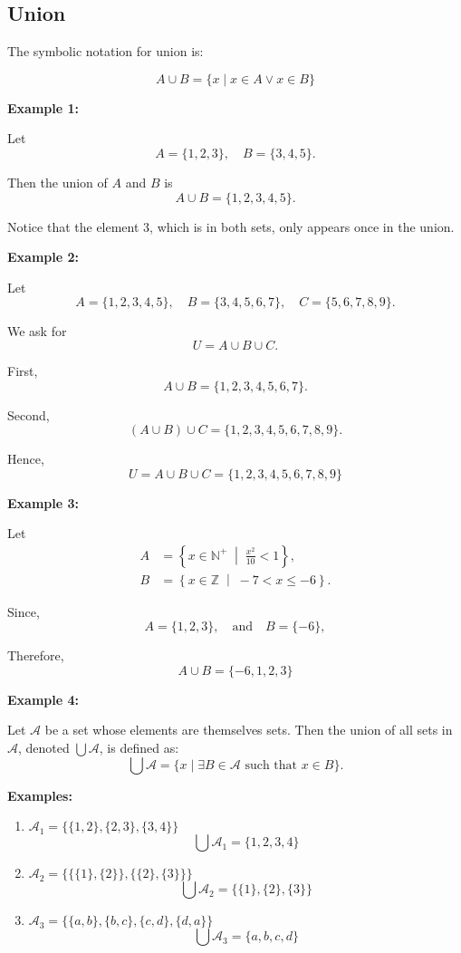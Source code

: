 \documentclass[12pt,a4paper,openany]{article}
\begin{document}
\subsection{Union}\label{Union}

The symbolic notation for union is:  

$$
A \cup B = \{x \mid x \in A \lor x \in B\}
$$

\textbf{Example 1:}

Let  
\[
A = \{1,2,3\}, \quad B = \{3,4,5\}.
\]

Then the union of $A$ and $B$ is  
\[
A \cup B = \{1,2,3,4,5\}.
\]

Notice that the element $3$, which is in both sets, only appears once in the union.

\textbf{Example 2:}

Let  
\[
A = \{1,2,3,4,5\}, \quad 
B = \{3,4,5,6,7\}, \quad
C = \{5,6,7,8,9\}.
\]

We ask for  
\[
U = A \cup B \cup C.
\]

First,  
\[
A \cup B = \{1,2,3,4,5,6,7\}.
\]

Second,  
\[
(A \cup B) \cup C = \{1,2,3,4,5,6,7,8,9\}.
\]

Hence,  
\[
\boxed{U = A \cup B \cup C = \{1,2,3,4,5,6,7,8,9\}}
\]

\textbf{Example 3:}

Let  
\[
\begin{aligned}
A &= \left\{ x \in \mathbb{N}^+ \;\middle|\; \frac{x^2}{10} < 1 \right\}, \\
B &= \left\{ x \in \mathbb{Z} \;\middle|\; -7 < x \leq -6 \right\}.
\end{aligned}
\]

Since,  
\[
A = \{1,2,3\}, \quad \text{and} \quad B = \{-6\},
\]

Therefore,  
\[
\boxed{A \cup B = \{-6,1,2,3\}}
\]

\textbf{Example 4:}

Let $\mathcal{A}$ be a set whose elements are themselves sets.  
Then the union of all sets in $\mathcal{A}$, denoted $\displaystyle\bigcup \mathcal{A}$, is defined as:
\[
\displaystyle\bigcup \mathcal{A} = \{ x \mid \exists B \in \mathcal{A} \text{ such that } x \in B \}.
\]

\textbf{Examples:}

\begin{enumerate}
    \item $\mathcal{A}_1 = \{ \{1,2\}, \{2,3\}, \{3,4\} \}$  
    \[
    \displaystyle\bigcup \mathcal{A}_1 = \{1,2,3,4\}
    \]
    
    \item $\mathcal{A}_2 = \{ \{ \{1\}, \{2\} \}, \{ \{2\}, \{3\} \} \}$  
    \[
    \displaystyle\bigcup \mathcal{A}_2 = \{ \{1\}, \{2\}, \{3\} \}
    \]
    
    \item $\mathcal{A}_3 = \{ \{a,b\}, \{b,c\}, \{c,d\}, \{d,a\} \}$  
    \[
    \displaystyle\bigcup \mathcal{A}_3 = \{a,b,c,d\}
    \]
\end{enumerate}
\end{document}
